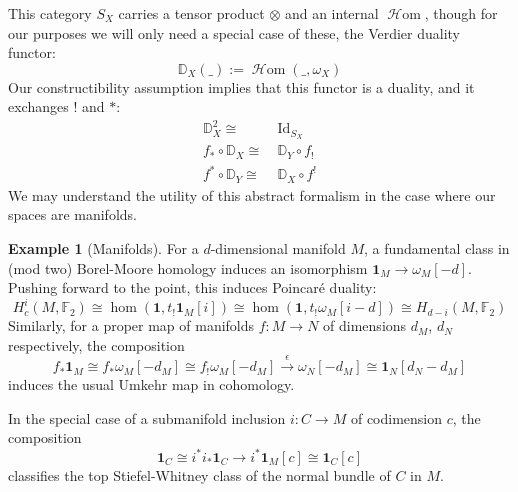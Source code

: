 \documentclass{amsart}
\theoremstyle{definition}
\newtheorem{ex}[thm]{Example}
\theoremstyle{remark}
\DeclareMathOperator{\Hom}{\mathcal{H}om}
\begin{document}
This category $S_X$ carries a tensor product $\otimes$ and an internal $\Hom$, though for our purposes we will only need a special case of these, the Verdier duality functor: \[\mathbb{D}_X(\_):=\Hom(\_,\omega_X)\]
Our constructibility assumption implies that this functor is a duality, and it exchanges $!$ and $*$:
\begin{align*}
\mathbb{D}_X^2\cong\ & \text{Id}_{S_X}\\
    f_*\circ \mathbb{D}_X\cong\ & \mathbb{D}_Y\circ f_!\\
    f^*\circ \mathbb{D}_Y\cong\ & \mathbb{D}_X\circ f^!
\end{align*}
We may understand the utility of this abstract formalism in the case where our spaces are manifolds.
\begin{ex}[Manifolds]\label{ex:Manifolds}
For a $d$-dimensional manifold $M$, a fundamental class in (mod two) Borel-Moore homology induces an isomorphism $\mathbf{1}_M\to \omega_M[-d]$. Pushing forward to the point, this induces Poincaré duality:
\[H^i_c(M,\mathbb{F}_2)\cong \hom(\mathbf{1},t_!\mathbf{1}_M[i])\cong \hom(\mathbf{1},t_!\omega_M[i-d])\cong H_{d-i}(M,\mathbb{F}_2)\]
Similarly, for a proper map of manifolds $f:M\to N$ of dimensions $d_M$, $d_N$ respectively, the composition \[f_*\mathbf{1}_M \cong f_*\omega_M[-d_M]\cong f_!\omega_M[-d_M]\xrightarrow{\epsilon} \omega_N[-d_M]\cong \mathbf{1}_N[d_N-d_M]\] induces the usual Umkehr map in cohomology.

In the special case of a submanifold inclusion $i:C\to M$ of codimension $c$, the composition \[\mathbf{1}_C\cong i^*i_*\mathbf{1}_C\to i^*\mathbf{1}_M[c]\cong \mathbf{1}_C[c]\] classifies the top Stiefel-Whitney class of the normal bundle of $C$ in $M$.
\end{ex}
\end{document}
